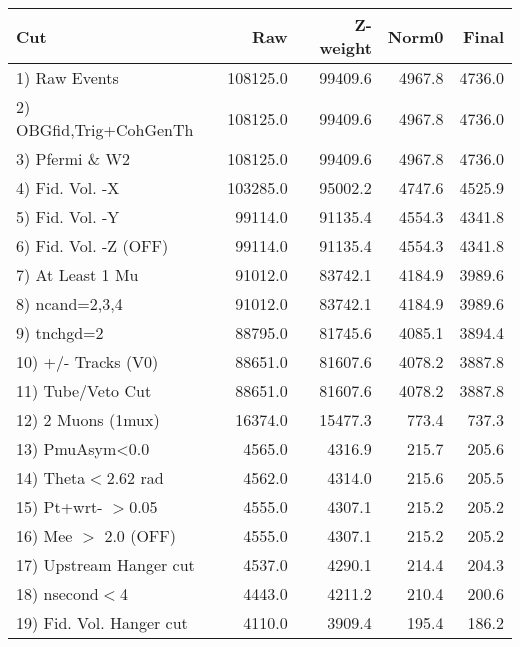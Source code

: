  \begin{table}[h!]\centering
 \begin{tabular}{||l||r|r|r|r||}
 \hline
 \hline
 Cut & Raw & Z-weight & Norm0 & Final \\
 \hline
  1) Raw Events           &    108125.0 &     99409.6 &      4967.8 &      4736.0 \\
  2) OBGfid,Trig+CohGenTh &    108125.0 &     99409.6 &      4967.8 &      4736.0 \\
  3) Pfermi \& W2         &    108125.0 &     99409.6 &      4967.8 &      4736.0 \\
  4) Fid. Vol. -X         &    103285.0 &     95002.2 &      4747.6 &      4525.9 \\
  5) Fid. Vol. -Y         &     99114.0 &     91135.4 &      4554.3 &      4341.8 \\
  6) Fid. Vol. -Z (OFF)   &     99114.0 &     91135.4 &      4554.3 &      4341.8 \\
  7) At Least 1 Mu        &     91012.0 &     83742.1 &      4184.9 &      3989.6 \\
  8) ncand=2,3,4          &     91012.0 &     83742.1 &      4184.9 &      3989.6 \\
  9) tnchgd=2             &     88795.0 &     81745.6 &      4085.1 &      3894.4 \\
 10) +/- Tracks (V0)      &     88651.0 &     81607.6 &      4078.2 &      3887.8 \\
 11) Tube/Veto Cut        &     88651.0 &     81607.6 &      4078.2 &      3887.8 \\
 12) 2 Muons (1mux)       &     16374.0 &     15477.3 &       773.4 &       737.3 \\
 13) PmuAsym<0.0          &      4565.0 &      4316.9 &       215.7 &       205.6 \\
 14) Theta$<$2.62 rad     &      4562.0 &      4314.0 &       215.6 &       205.5 \\
 15) Pt+wrt- $>$0.05      &      4555.0 &      4307.1 &       215.2 &       205.2 \\
 16) Mee $>$ 2.0  (OFF)   &      4555.0 &      4307.1 &       215.2 &       205.2 \\
 17) Upstream Hanger cut  &      4537.0 &      4290.1 &       214.4 &       204.3 \\
 18) nsecond$<$4          &      4443.0 &      4211.2 &       210.4 &       200.6 \\
 19) Fid. Vol. Hanger cut &      4110.0 &      3909.4 &       195.4 &       186.2 \\

\end{tabular}
\end{table}
